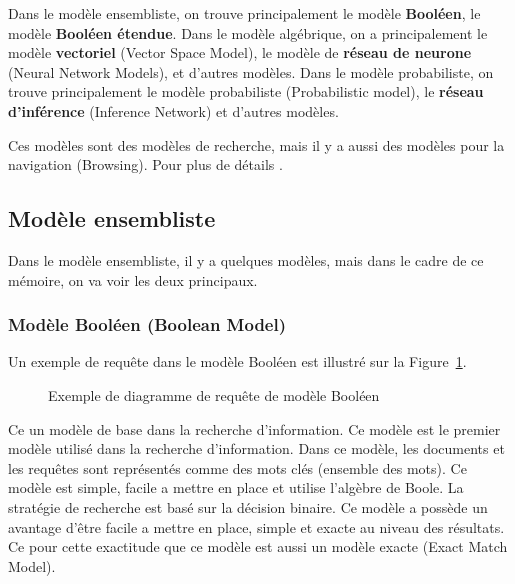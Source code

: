 Dans le modèle ensembliste, on trouve principalement le modèle \textbf{Booléen}, le modèle \textbf{Booléen étendue}. Dans le modèle algébrique, on a principalement le modèle \textbf{vectoriel} (Vector Space Model), le modèle de \textbf{réseau de neurone} (Neural Network Models), et d'autres modèles. Dans le modèle probabiliste, on trouve principalement le modèle probabiliste (Probabilistic model), le \textbf{réseau d'inférence} (Inference Network) et d'autres modèles.

Ces modèles sont des modèles de recherche, mais il y a aussi des modèles pour la navigation (Browsing). Pour plus de détails \citep{modern-ir}.

\subsection{Modèle ensembliste}
Dans le modèle ensembliste, il y a quelques modèles, mais dans le cadre de ce mémoire, on va voir les deux principaux.

\subsubsection{Modèle Booléen (Boolean Model)}
Un exemple de requête dans le modèle Booléen est illustré sur la Figure~\ref{fig:boolean-model}.

\begin{figure}[htbp]
    \begin{center}
    \end{center}
    \caption{Exemple de diagramme de requête de modèle Booléen \citep{model-ir}}
    \label{fig:boolean-model}
\end{figure}

Ce un modèle de base dans la recherche d'information. Ce modèle est le premier modèle utilisé dans la recherche d'information. Dans ce modèle, les documents et les requêtes sont représentés comme des mots clés (ensemble des mots). Ce modèle est simple, facile a mettre en place et utilise l'algèbre de Boole. La stratégie de recherche est basé sur la décision binaire.
Ce modèle a possède un avantage d'être facile a mettre en place, simple et exacte au niveau des résultats. Ce pour cette exactitude que ce modèle est aussi un modèle exacte (Exact Match Model).

